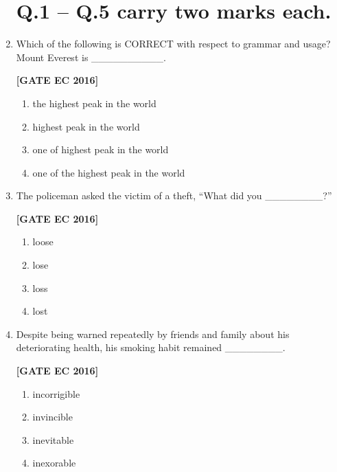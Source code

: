 \documentclass[12pt]{article}
\begin{document}
\begin{enumerate}[label=\textbf{Q.\arabic*.}, start=1, itemsep=2em]

\section*{Q.1 -- Q.5 carry two marks each.}

\item Which of the following is CORRECT with respect to grammar and usage? Mount Everest is \_\_\_\_\_\_\_\_\_\_.

\noindent \textbf{[GATE EC 2016]}

\begin{multicols}{2}
\begin{enumerate}[label=\Alph*.]
    \item the highest peak in the world
    \item highest peak in the world
    \item one of highest peak in the world
    \item one of the highest peak in the world
\end{enumerate}
\end{multicols}

\item The policeman asked the victim of a theft, “What did you \_\_\_\_\_\_\_\_?”

\noindent \textbf{[GATE EC 2016]}

\begin{multicols}{2}
\begin{enumerate}[label=\Alph*.]
    \item loose
    \item lose
    \item loss
    \item lost
\end{enumerate}
\end{multicols}

\item Despite being warned repeatedly by friends and family about his deteriorating health, his smoking habit remained \_\_\_\_\_\_\_\_.

\noindent \textbf{[GATE EC 2016]}

\begin{multicols}{2}
\begin{enumerate}[label=\Alph*.]
    \item incorrigible
    \item invincible
    \item inevitable
    \item inexorable
\end{enumerate}
\end{multicols}


\end{enumerate}
\end{document}
